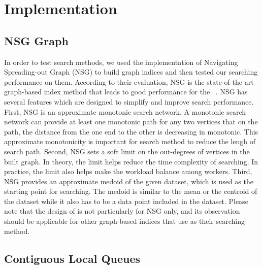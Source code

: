 \section{Implementation}\label{minjia_sec:implementation}

\subsection{NSG Graph}

In order to test search methods, we used the implementation of Navigating Spreading-out Graph (NSG) to build graph indices and then tested our searching performance on them. According to their evaluation, NSG is the state-of-the-art graph-based index method that leads to good performance for the \SeqFullName~\cite{fu2019fast}.
NSG has several features which are designed to simplify and improve search performance.
First, NSG is an approximate monotonic search network. A monotonic search network can provide at least one monotonic path for any two vertices that on the path, the distance from the one end to the other is decreasing in monotonic. This approximate monotonicity is important for search method to reduce the lengh of search path.
Second, NSG sets a soft limit on the out-degrees of vertices in the built graph. In theory, the limit helps reduce the time complexity of searching. In practice, the limit also helps make the workload balance among workers.
Third, NSG provides an approximate medoid of the given dataset, which is used as the starting point for searching. The medoid is similar to the mean or the centroid of the dataset while it also has to be a data point included in the dataset. Please note that the design of \FullName is not particularly for NSG only, and its observation should be applicable for other graph-based indices that use \SeqFullName as their searching method.


\subsection{Contiguous Local Queues}

